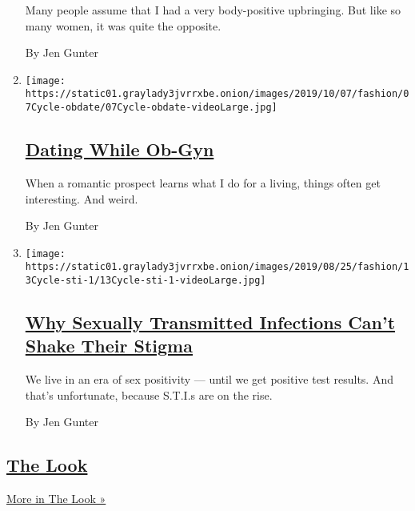 \begin{enumerate}
  Many people assume that I had a very body-positive upbringing. But
  like so many women, it was quite the opposite.

  By Jen Gunter
\item
  \texttt{[image: https://static01.graylady3jvrrxbe.onion/images/2019/10/07/fashion/07Cycle-obdate/07Cycle-obdate-videoLarge.jpg]}

  \hypertarget{dating-while-ob-gyn}{%
  \subsection{\texorpdfstring{\href{/2019/10/08/style/dating-while-ob-gyn.html}{Dating
  While Ob-Gyn}}{Dating While Ob-Gyn}}\label{dating-while-ob-gyn}}

  When a romantic prospect learns what I do for a living, things often
  get interesting. And weird.

  By Jen Gunter
\item
  \texttt{[image: https://static01.graylady3jvrrxbe.onion/images/2019/08/25/fashion/13Cycle-sti-1/13Cycle-sti-1-videoLarge.jpg]}

  \hypertarget{why-sexually-transmitted-infections-cant-shake-their-stigma}{%
  \subsection{\texorpdfstring{\href{/2019/08/13/style/sti-stigma-sexual-transmitted-infections.html}{Why
  Sexually Transmitted Infections Can't Shake Their
  Stigma}}{Why Sexually Transmitted Infections Can't Shake Their Stigma}}\label{why-sexually-transmitted-infections-cant-shake-their-stigma}}

  We live in an era of sex positivity --- until we get positive test
  results. And that's unfortunate, because S.T.I.s are on the rise.

  By Jen Gunter
\end{enumerate}

\hypertarget{the-look}{%
\subsection{\texorpdfstring{\href{/column/the-look}{The
Look}}{The Look}}\label{the-look}}

\href{/column/the-look}{More in The Look »}

